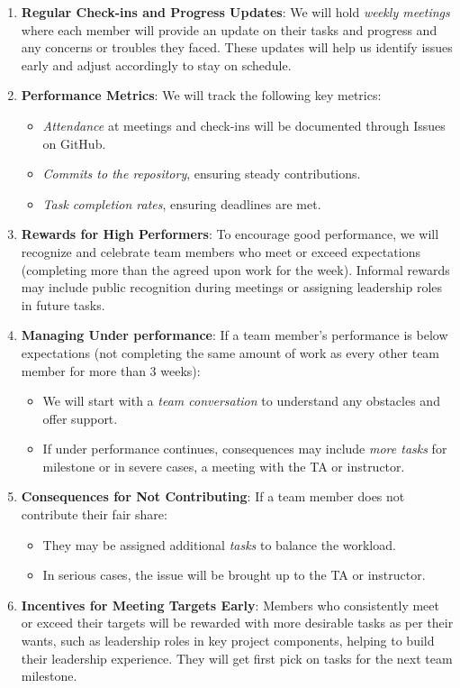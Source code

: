 \documentclass{article}
\begin{document}
\begin{enumerate}
    \item \textbf{Regular Check-ins and Progress Updates}: We will hold \textit{weekly meetings} where each member will
    provide an update on their tasks and progress and any concerns or troubles they faced. These updates will help us identify issues
    early and adjust accordingly to stay on schedule.
    \item \textbf{Performance Metrics}: We will track the following key metrics:
    \begin{itemize}
        \item \textit{Attendance} at meetings and check-ins will be documented through Issues on GitHub.
        \item \textit{Commits to the repository}, ensuring steady contributions.
        \item \textit{Task completion rates}, ensuring deadlines are met.
    \end{itemize}
    \item \textbf{Rewards for High Performers}: To encourage good performance, we will recognize and celebrate team members who meet or exceed expectations (completing more than the agreed upon work for the week). Informal rewards may include public recognition during meetings or assigning leadership roles in future tasks.
    \item \textbf{Managing Under performance}: If a team member's performance is below expectations (not completing the same amount of work as every other team member for more than 3 weeks):
    \begin{itemize}
        \item We will start with a \textit{team conversation} to understand any obstacles and offer support.
        \item If under performance continues, consequences may include \textit{more tasks} for milestone or in severe cases, a meeting with
        the TA or instructor.
    \end{itemize}
    \item \textbf{Consequences for Not Contributing}: If a team member does not contribute their fair share:
    \begin{itemize}
        \item They may be assigned additional \textit{tasks} to balance the workload.
        \item In serious cases, the issue will be brought up to the TA or instructor.
    \end{itemize}
    \item \textbf{Incentives for Meeting Targets Early}: Members who consistently meet or exceed their targets will be rewarded with more
    desirable tasks as per their wants, such as leadership roles in key project components, helping to build their leadership experience. They
    will get first pick on tasks for the next team milestone.

\end{enumerate}
\end{document}
